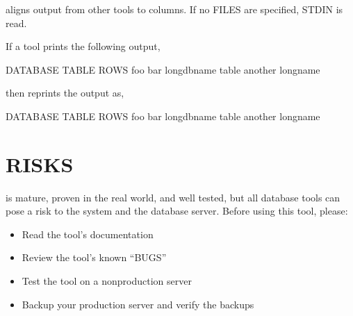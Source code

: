 \documentclass[letterpaper,10pt,english]{sphinxmanual}
\begin{document}
\sphinxAtStartPar
{} aligns output from other tools to columns.  If no FILES are specified,
STDIN is read.

\sphinxAtStartPar
If a tool prints the following output,

\begin{sphinxVerbatim}[commandchars=\\\{\}]
DATABASE TABLE   ROWS
foo      bar      
long\PYGZus{}db\PYGZus{}name table  
another  long\PYGZus{}name 
\end{sphinxVerbatim}

\sphinxAtStartPar
then  reprints the output as,

\begin{sphinxVerbatim}[commandchars=\\\{\}]
DATABASE     TABLE     ROWS
foo          bar        
long\PYGZus{}db\PYGZus{}name table        
another      long\PYGZus{}name  
\end{sphinxVerbatim}


\section{RISKS}
\label{\detokenize{mariadb-align-output:risks}}
\sphinxAtStartPar
{} is mature, proven in the real world, and well tested,
but all database tools can pose a risk to the system and the database
server.  Before using this tool, please:
\begin{itemize}
\item {} 
\sphinxAtStartPar
Read the tool’s documentation

\item {} 
\sphinxAtStartPar
Review the tool’s known “BUGS”

\item {} 
\sphinxAtStartPar
Test the tool on a non\sphinxhyphen{}production server

\item {} 
\sphinxAtStartPar
Backup your production server and verify the backups

\end{itemize}
\end{document}
